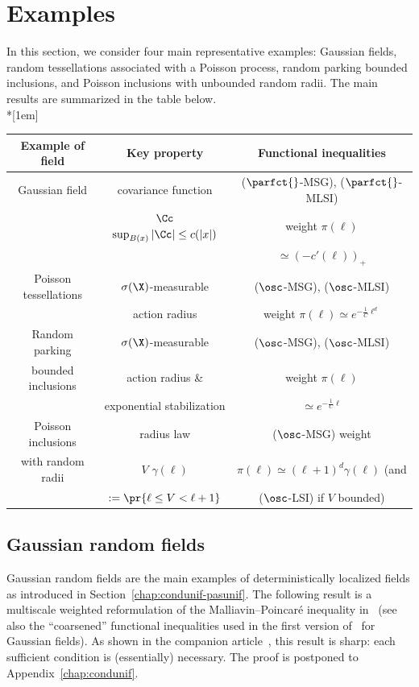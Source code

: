 \section{Examples}\label{sec:examples}

In this section, we consider four main representative examples: Gaussian fields, random tessellations associated with a Poisson process, random parking bounded inclusions, and Poisson inclusions with unbounded random radii. The main results are summarized in the table below.
\ \\*[1em]
\begin{center}
\renewcommand{\arraystretch}{1.2}
\begin{tabular}{|c|c|c|}
\hline {\bf Example of field} & {\bf Key property} & {\bf Functional inequalities} \\ 
\hline Gaussian field & covariance function  & ($\parfct{}$-MSG), ($\parfct{}$-MLSI) \\ & $\Cc$ $\sup_{B(x)}|\Cc|\le c(|x|)$ & weight $\pi(\ell)$ \\ & &  $\simeq (-c'(\ell))_+$ \tabularnewline
\hline Poisson tessellations & $\sigma(\X)$-measurable  & ($\osc$-MSG), ($\osc$-MLSI) \\ & action radius & weight $\pi(\ell)\simeq e^{-\frac1C\ell^d}$ \\
\hline Random parking  & $\sigma(\X)$-measurable   & ($\osc$-MSG), ($\osc$-MLSI) \\ bounded inclusions & action radius \& &  weight $\pi(\ell)$ \\ & exponential stabilization & $\simeq e^{-\frac1C\ell}$ \\
\hline Poisson inclusions & radius law  & ($\osc$-MSG) weight \\ with random radii & $V$ $\gamma(\ell)$ &
$\pi(\ell)\simeq (\ell+1)^d\gamma(\ell)$ (and \\ & $:=\pr{\ell\le V<\ell+1}$ & ($\osc$-LSI) if $V$ bounded)\\
\hline
\end{tabular}
\end{center}
\pagebreak

\subsection{Gaussian random fields}\label{chap:gaussian}

Gaussian random fields are the main examples of deterministically localized fields as introduced in Section~\ref{chap:condunif-pasunif}. The following result is a multiscale weighted reformulation of the Malliavin--Poin\-caré inequality in~\cite{Houdre-PerezAbreu-95} (see also the ``coarsened'' functional inequalities used in the first version of~\cite{GNO-reg} for Gaussian fields). As shown in the companion article~\cite[Proposition~2.3]{DG1}, this result is sharp: each sufficient condition is (essentially) necessary. The proof is postponed to Appendix~\ref{chap:condunif}.

